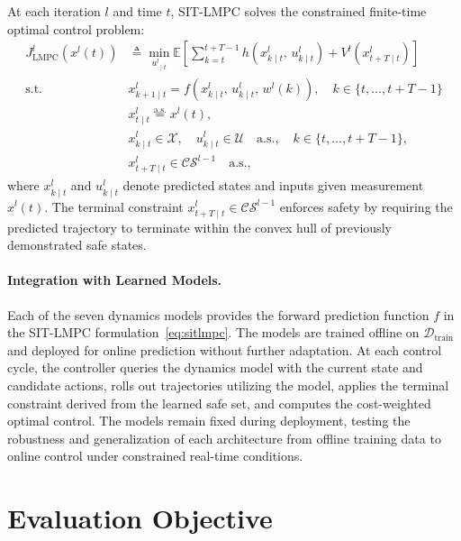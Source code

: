 At each iteration $l$ and time $t$, SIT-LMPC solves the constrained finite-time optimal control problem:
\begin{subequations}
\label{eq:sitlmpc}
\begin{align}
  J_{\text{LMPC}}^{l}(x^{l}(t)) &\triangleq \min_{u^{l}_{\cdot \mid t}} \mathbb{E}\!\left[\sum_{k=t}^{t+T-1} h(x^{l}_{k \mid t},\, u^{l}_{k \mid t}) + V^{l}(x^{l}_{t+T \mid t})\right] \\
  \text{s.t.} \quad & x^{l}_{k+1 \mid t} = f(x^{l}_{k \mid t},\, u^{l}_{k \mid t},\, w^{l}(k)), \quad k \in \{t, \ldots, t+T-1\} \\
  & x^{l}_{t \mid t} \stackrel{\text{a.s.}}{=} x^{l}(t), \\
  & x^{l}_{k \mid t} \in \mathcal{X},\quad u^{l}_{k \mid t} \in \mathcal{U} \quad \text{a.s.}, \quad k \in \{t, \ldots, t+T-1\}, \\
  & x^{l}_{t+T \mid t} \in \mathcal{CS}^{l-1} \quad \text{a.s.},
\end{align}
\end{subequations}
where $x^{l}_{k \mid t}$ and $u^{l}_{k \mid t}$ denote predicted states and inputs given measurement $x^{l}(t)$. The terminal constraint $x^{l}_{t+T \mid t} \in \mathcal{CS}^{l-1}$ enforces safety by requiring the predicted trajectory to terminate within the convex hull of previously demonstrated safe states.

\paragraph{Integration with Learned Models.}
Each of the seven dynamics models provides the forward prediction function $f$ in the SIT-LMPC formulation~\eqref{eq:sitlmpc}. The models are trained offline on $\mathcal{D}_{\text{train}}$ and deployed for online prediction without further adaptation. At each control cycle, the controller queries the dynamics model with the current state and candidate actions, rolls out trajectories utilizing the model, applies the terminal constraint derived from the learned safe set, and computes the cost-weighted optimal control. The models remain fixed during deployment, testing the robustness and generalization of each architecture from offline training data to online control under constrained real-time conditions.

\section{Evaluation Objective}
\label{sec:eval-objective}

